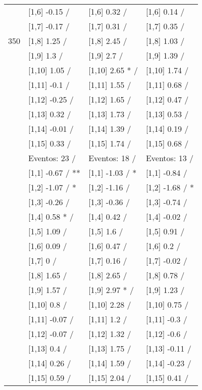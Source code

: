 \begin{table}
\begin{tabular}[t]{llll}
 & {}[1,6] -0.15  / & {}[1,6] 0.32  / & {}[1,6] 0.14  /\\
 & {}[1,7] -0.17  / & {}[1,7] 0.31  / & {}[1,7] 0.35  /\\
350 & {}[1,8] 1.25  / & {}[1,8] 2.45  / & {}[1,8] 1.03  /\\
\addlinespace
 & {}[1,9] 1.3  / & {}[1,9] 2.7  / & {}[1,9] 1.39  /\\
 & {}[1,10] 1.05  / & {}[1,10] 2.65 * / & {}[1,10] 1.74  /\\
 & {}[1,11] -0.1  / & {}[1,11] 1.55  / & {}[1,11] 0.68  /\\
 & {}[1,12] -0.25  / & {}[1,12] 1.65  / & {}[1,12] 0.47  /\\
 & {}[1,13] 0.32  / & {}[1,13] 1.73  / & {}[1,13] 0.53  /\\
\addlinespace
 & {}[1,14] -0.01  / & {}[1,14] 1.39  / & {}[1,14] 0.19  /\\
 & {}[1,15] 0.33  / & {}[1,15] 1.74  / & {}[1,15] 0.68  /\\
 & Eventos:  23 / & Eventos:  18 / & Eventos:  13 /\\
 & {}[1,1] -0.67  / ** & {}[1,1] -1.03  / * & {}[1,1] -0.84  /\\
 & {}[1,2] -1.07  / * & {}[1,2] -1.16  / & {}[1,2] -1.68  / *\\
\addlinespace
 & {}[1,3] -0.26  / & {}[1,3] -0.36  / & {}[1,3] -0.74  /\\
 & {}[1,4] 0.58 * / & {}[1,4] 0.42  / & {}[1,4] -0.02  /\\
 & {}[1,5] 1.09  / & {}[1,5] 1.6  / & {}[1,5] 0.91  /\\
 & {}[1,6] 0.09  / & {}[1,6] 0.47  / & {}[1,6] 0.2  /\\
 & {}[1,7] 0  / & {}[1,7] 0.16  / & {}[1,7] -0.02  /\\
\addlinespace
500 & {}[1,8] 1.65  / & {}[1,8] 2.65  / & {}[1,8] 0.78  /\\
 & {}[1,9] 1.57  / & {}[1,9] 2.97 * / & {}[1,9] 1.23  /\\
 & {}[1,10] 0.8  / & {}[1,10] 2.28  / & {}[1,10] 0.75  /\\
 & {}[1,11] -0.07  / & {}[1,11] 1.2  / & {}[1,11] -0.3  /\\
 & {}[1,12] -0.07  / & {}[1,12] 1.32  / & {}[1,12] -0.6  /\\
\addlinespace
 & {}[1,13] 0.4  / & {}[1,13] 1.75  / & {}[1,13] -0.11  /\\
 & {}[1,14] 0.26  / & {}[1,14] 1.59  / & {}[1,14] -0.23  /\\
 & {}[1,15] 0.59  / & {}[1,15] 2.04  / & {}[1,15] 0.41  /\\
\bottomrule
\end{tabular}
\end{table}
